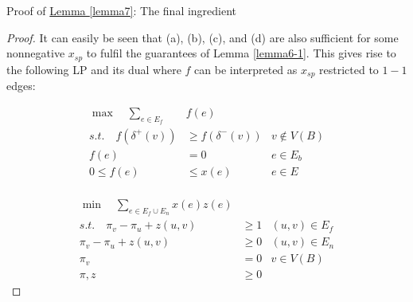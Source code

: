 \documentclass[./main.tex]{subfiles}
\begin{document}
\begin{subsection}{Proof of \hyperref[lemma7]{Lemma \ref{lemma7}}: The final ingredient}
\begin{proof}
		It can easily be seen that (a), (b), (c), and (d) are also sufficient for some nonnegative $x_{sp}$ to fulfil the guarantees of Lemma \ref{lemma6-1}.
		 This gives rise to the following LP and its dual where $f$ can be interpreted as $x_{sp}$ restricted to $1-1$ edges:\vspace{2mm}\\
		\begin{minipage}{0.39\textwidth}
		\begin{align*}
			\max\quad\sum_{e\in E_f}&f(e)\\
			s.t.\quad f(\delta^+(v))&\geq f(\delta^-(v))   &v\notin V(B)              \\
			f(e)&=0  &e\in E_b\\
			0\leq f(e)&\leq x(e) &e\in E\\
		\end{align*}
		\end{minipage}
	\hfill\vline\hfill
	\begin{minipage}{0.50\textwidth}
	\begin{align*}
		\min\quad\sum_{e\in E_f\cup E_n}x(e)z(e)\\
		s.t.\quad \pi_v - \pi_u + z(u,v)&\geq 1 &(u,v)\in E_f\\
		\pi_v - \pi_u + z(u,v)&\geq 0 &(u,v)\in E_n\\
		\pi_v &= 0 &v\in V(B)\\
		\pi, z&\geq 0
	\end{align*}
	\end{minipage}


\end{proof}
\end{subsection}
\end{document}
